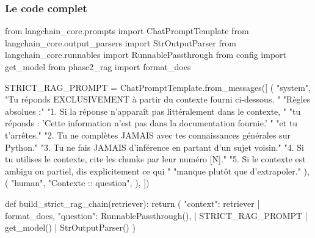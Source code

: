 \documentclass[11pt,a4paper]{article}
\begin{document}
\begin{center}
\end{center}

\subsubsection{Le code complet}

\begin{pythoncode}
from langchain_core.prompts import ChatPromptTemplate
from langchain_core.output_parsers import StrOutputParser
from langchain_core.runnables import RunnablePassthrough
from config import get_model
from phase2_rag import format_docs


STRICT_RAG_PROMPT = ChatPromptTemplate.from_messages([
    (
        "system",
        "Tu réponds EXCLUSIVEMENT à partir du contexte fourni ci-dessous. "
        "Règles absolues :\n"
        "1. Si la réponse n'apparaît pas littéralement dans le contexte, "
        "tu réponds : 'Cette information n'est pas dans la documentation fournie.' "
        "et tu t'arrêtes.\n"
        "2. Tu ne complètes JAMAIS avec tes connaissances générales sur Python.\n"
        "3. Tu ne fais JAMAIS d'inférence en partant d'un sujet voisin.\n"
        "4. Si tu utilises le contexte, cite les chunks par leur numéro [N].\n"
        "5. Si le contexte est ambigu ou partiel, dis explicitement ce qui "
        "manque plutôt que d'extrapoler."
    ),
    (
        "human",
        "Contexte :\n\nQuestion : {question}",
    ),
])


def build_strict_rag_chain(retriever):
    return (
        {
            "context":  retriever | format_docs,
            "question": RunnablePassthrough(),
        }
        | STRICT_RAG_PROMPT
        | get_model()
        | StrOutputParser()
    )
\end{pythoncode}
\end{document}
